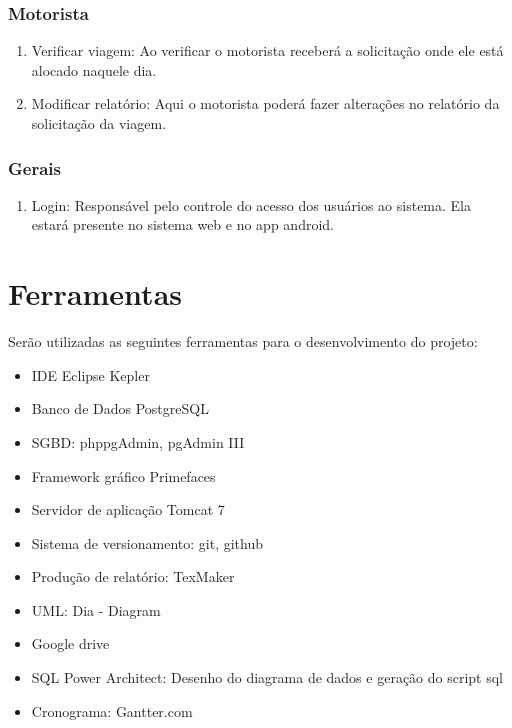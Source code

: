 \documentclass[11pt]{article}
\begin{document}
\subsubsection{Motorista}
\begin{enumerate}
\item Verificar viagem: Ao verificar o motorista receberá a solicitação onde ele está alocado naquele dia.
\item Modificar relatório: Aqui o motorista poderá fazer alterações no relatório da solicitação da viagem.
\end{enumerate}

\subsubsection{Gerais}
\begin{enumerate}
\item Login: Responsável pelo controle do acesso dos usuários ao sistema. Ela estará presente no sistema web e no app android.
\end{enumerate}

\section{Ferramentas}
Serão utilizadas as seguintes ferramentas para o desenvolvimento do projeto:
\begin{itemize}
\item IDE Eclipse Kepler
\item Banco de Dados PostgreSQL
\item SGBD: phppgAdmin, pgAdmin III
\item Framework gráfico Primefaces
\item Servidor de aplicação Tomcat 7
\item Sistema de versionamento: git, github
\item Produção de relatório: TexMaker
\item UML: Dia - Diagram
\item Google drive
\item SQL Power Architect: Desenho do diagrama de dados e geração do script sql
\item Cronograma: Gantter.com
\end{itemize}
\end{document}
